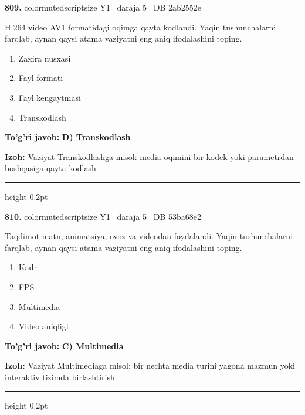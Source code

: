 \documentclass[10pt,a4paper,oneside]{article}
\begin{document}
\noindent\textbf{\color{ink}809.}  {color{muted}scriptsize Y1 \textbullet\ daraja 5 \textbullet\ DB 2ab2552e}
\par
H.264 video AV1 formatidagi oqimga qayta kodlandi. Yaqin tushunchalarni farqlab, aynan qaysi atama vaziyatni eng aniq ifodalashini toping.
\begin{enumerate}[label=\Alph*),leftmargin=9mm]
\item Zaxira nusxasi
\item Fayl formati
\item Fayl kengaytmasi
\item Transkodlash
\end{enumerate}
\begin{tcolorbox}[enhanced,breakable,colback=teal!4,colframe=teal!50!black,boxrule=0.5pt,arc=1.1mm,left=3mm,right=3mm,top=1.7mm,bottom=1.7mm,before skip=2mm,after skip=2mm]
\textbf{\color{teal}To'g'ri javob:} \textbf{D) Transkodlash}
\par\smallskip
\textbf{Izoh:} Vaziyat Transkodlashga misol: media oqimini bir kodek yoki parametrdan boshqasiga qayta kodlash.
\end{tcolorbox}
\vspace{2mm}\hrule height 0.2pt \vspace{3mm}

\noindent\textbf{\color{ink}810.}  {color{muted}scriptsize Y1 \textbullet\ daraja 5 \textbullet\ DB 53ba68e2}
\par
Taqdimot matn, animatsiya, ovoz va videodan foydalandi. Yaqin tushunchalarni farqlab, aynan qaysi atama vaziyatni eng aniq ifodalashini toping.
\begin{enumerate}[label=\Alph*),leftmargin=9mm]
\item Kadr
\item FPS
\item Multimedia
\item Video aniqligi
\end{enumerate}
\begin{tcolorbox}[enhanced,breakable,colback=teal!4,colframe=teal!50!black,boxrule=0.5pt,arc=1.1mm,left=3mm,right=3mm,top=1.7mm,bottom=1.7mm,before skip=2mm,after skip=2mm]
\textbf{\color{teal}To'g'ri javob:} \textbf{C) Multimedia}
\par\smallskip
\textbf{Izoh:} Vaziyat Multimediaga misol: bir nechta media turini yagona mazmun yoki interaktiv tizimda birlashtirish.
\end{tcolorbox}
\vspace{2mm}\hrule height 0.2pt \vspace{3mm}
\end{document}

